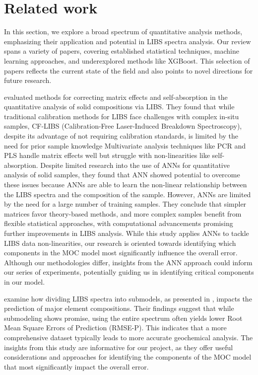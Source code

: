 \section{Related work}\label{sec:related_works}
In this section, we explore a broad spectrum of quantitative analysis methods, emphasizing their application and potential in LIBS spectra analysis. Our review spans a variety of papers, covering established statistical techniques, machine learning approaches, and underexplored methods like XGBoost. This selection of papers reflects the current state of the field and also points to novel directions for future research.

\citeauthor{takahashi_quantitative_2017} evaluated methods for correcting matrix effects and self-absorption in the quantitative analysis of solid compositions via LIBS.
They found that while traditional calibration methods for LIBS face challenges with complex in-situ samples, CF-LIBS (Calibration-Free Laser-Induced Breakdown Spectroscopy), despite its advantage of not requiring calibration standards, is limited by the need for prior sample knowledge\cite{hu_review_2022}
Multivariate analysis techniques like PCR and PLS handle matrix effects well but struggle with non-linearities like self-absorption.
Despite limited research into the use of ANNs for quantitative analysis of solid samples, they found that ANN showed potential to overcome these issues because ANNs are able to learn the non-linear relationship between the LIBS spectra and the composition of the sample.
However, ANNs are limited by the need for a large number of training samples.
They conclude that simpler matrices favor theory-based methods, and more complex samples benefit from flexible statistical approaches, with computational advancements promising further improvements in LIBS analysis\cite{takahashi_quantitative_2017}.
While this study applies ANNs to tackle LIBS data non-linearities, our research is oriented towards identifying which components in the MOC model most significantly influence the overall error. Although our methodologies differ, insights from the ANN approach could inform our series of experiments, potentially guiding us in identifying critical components in our model.

\citeauthor{lepore_quantitative_2022} examine how dividing LIBS spectra into submodels, as presented in \citet{andersonImprovedAccuracyQuantitative2017}, impacts the prediction of major element compositions.
Their findings suggest that while submodeling shows promise, using the entire spectrum often yields lower Root Mean Square Errors of Prediction (RMSE-P). 
This indicates that a more comprehensive dataset typically leads to more accurate geochemical analysis\cite{lepore_quantitative_2022}.
The insights from this study are informative for our project, as they offer useful considerations and approaches for identifying the components of the MOC model that most significantly impact the overall error.

